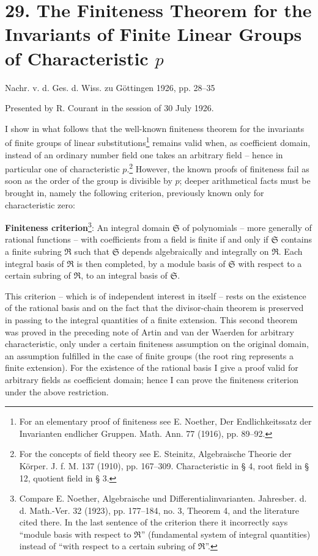 ﻿\section*{29. The Finiteness Theorem for the Invariants of Finite Linear Groups of Characteristic $p$}

\begin{center}
Nachr. v. d. Ges. d. Wiss. zu Göttingen 1926, pp. 28--35
\end{center}

Presented by R. Courant in the session of 30 July 1926.

I show in what follows that the well-known finiteness theorem for the invariants of finite groups of linear substitutions\footnote{For an elementary proof of finiteness see E. Noether, Der Endlichkeitssatz der Invarianten endlicher Gruppen. Math. Ann. 77 (1916), pp. 89--92.} remains valid when, as coefficient domain, instead of an ordinary number field one takes an arbitrary field -- hence in particular one of characteristic $p$.\footnote{For the concepts of field theory see E. Steinitz, Algebraische Theorie der Körper. J. f. M. 137 (1910), pp. 167--309. Characteristic in § 4, root field in § 12, quotient field in § 3.} However, the known proofs of finiteness fail as soon as the order of the group is divisible by $p$; deeper arithmetical facts must be brought in, namely the following criterion, previously known only for characteristic zero:

\textbf{Finiteness criterion}\footnote{Compare E. Noether, Algebraische und Differentialinvarianten. Jahresber. d. d. Math.-Ver. 32 (1923), pp. 177--184, no. 3, Theorem 4, and the literature cited there. In the last sentence of the criterion there it incorrectly says ``module basis with respect to $\mathfrak R$'' (fundamental system of integral quantities) instead of ``with respect to a certain subring of $\mathfrak R$''.}: An integral domain $\mathfrak S$ of polynomials -- more generally of rational functions -- with coefficients from a field is finite if and only if $\mathfrak S$ contains a finite subring $\mathfrak R$ such that $\mathfrak S$ depends algebraically and integrally on $\mathfrak R$. Each integral basis of $\mathfrak R$ is then completed, by a module basis of $\mathfrak S$ with respect to a certain subring of $\mathfrak R$, to an integral basis of $\mathfrak S$.

This criterion -- which is of independent interest in itself -- rests on the existence of the rational basis and on the fact that the divisor-chain theorem is preserved in passing to the integral quantities of a finite extension. This second theorem was proved in the preceding note of Artin and van der Waerden for arbitrary characteristic, only under a certain finiteness assumption on the original domain, an assumption fulfilled in the case of finite groups (the root ring represents a finite extension). For the existence of the rational basis I give a proof valid for arbitrary fields as coefficient domain; hence I can prove the finiteness criterion under the above restriction.

